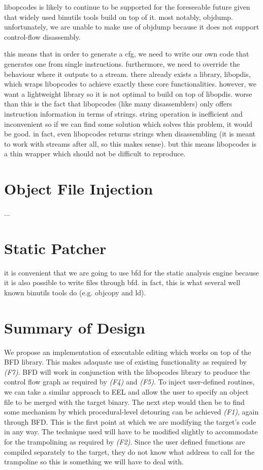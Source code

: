 libopcodes is likely to continue to be supported for the foreseeable future given that widely used binutils tools build on top of it. most notably, objdump. unfortunately, we are unable to make use of objdump because it does not support control-flow disassembly.

this means that in order to generate a cfg, we need to write our own code that generates one from single instructions. furthermore, we need to override the behaviour where it outputs to a stream. there already exists a library, libopdis, which wraps libopcodes to achieve exactly these core functionalities. however, we want a lightweight library so it is not optimal to build on top of libopdis. worse than this is the fact that libopcodes (like many disassemblers) only offers instruction information in terms of strings. string operation is inefficient and inconvenient so if we can find some solution which solves this problem, it would be good. in fact, even libopcodes returns strings when disassembling (it is meant to work with streams after all, so this makes sense). but this means libopcodes is a thin wrapper which should not be difficult to reproduce.

\section{Object File Injection}

...

\section{Static Patcher}

it is convenient that we are going to use bfd for the static analysis engine because it is also possible to write files through bfd. in fact, this is what several well known binutils tools do (e.g. objcopy and ld).

\section{Summary of Design}

We propose an implementation of executable editing which works on top of the BFD library. This makes adaquate use of existing functionality as required by \emph{(F7)}. BFD will work in conjunction with the libopcodes library to produce the control flow graph as required by \emph{(F4)} and \emph{(F5)}. To inject user-defined routines, we can take a similar approach to EEL and allow the user to specify an object file to be merged with the target binary. The next step would then be to find some mechanism by which procedural-level detouring can be achieved \emph{(F1)}, again through BFD. This is the first point at which we are modifying the target's code in any way. The technique used will have to be modified slightly to accommodate for the trampolining as required by \emph{(F2)}. Since the user defined functions are compiled separately to the target, they do not know what address to call for the trampoline so this is something we will have to deal with.